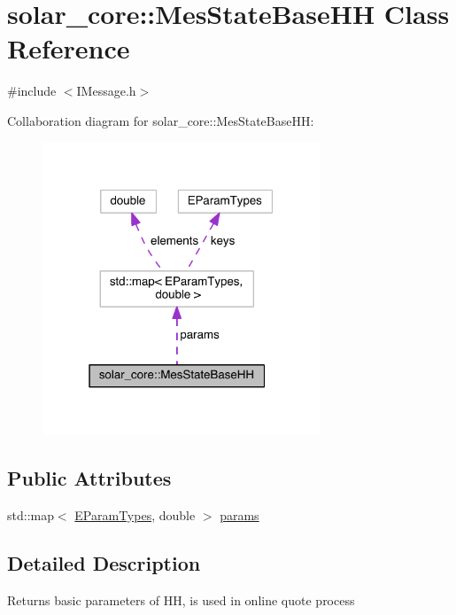 \hypertarget{classsolar__core_1_1_mes_state_base_h_h}{}\section{solar\+\_\+core\+:\+:Mes\+State\+Base\+H\+H Class Reference}
\label{classsolar__core_1_1_mes_state_base_h_h}


{\ttfamily \#include $<$I\+Message.\+h$>$}



Collaboration diagram for solar\+\_\+core\+:\+:Mes\+State\+Base\+H\+H\+:\nopagebreak
\begin{figure}[H]
\begin{center}
\leavevmode
\includegraphics[width=235pt]{classsolar__core_1_1_mes_state_base_h_h__coll__graph}
\end{center}
\end{figure}
\subsection*{Public Attributes}
\begin{DoxyCompactItemize}
\item 
std\+::map$<$ \hyperlink{namespacesolar__core_aa1147341e5ef7a40d68d1bd68e149362}{E\+Param\+Types}, double $>$ \hyperlink{classsolar__core_1_1_mes_state_base_h_h_a75575469dfbf7a86bd1ea95fb85c5194}{params}
\end{DoxyCompactItemize}


\subsection{Detailed Description}
Returns basic parameters of H\+H, is used in online quote process

